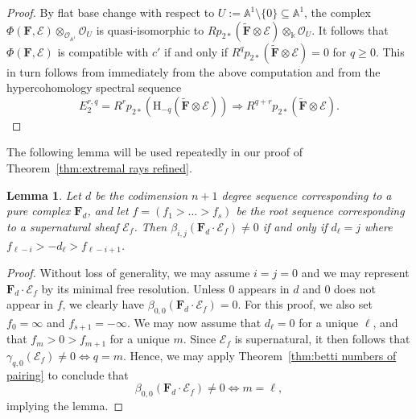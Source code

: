 \documentclass[12pt]{amsart}
\newtheorem{lemma}{Lemma}[section]
\theoremstyle{definition}
\theoremstyle{remark}
\newcommand{\kk}{\Bbbk}
\renewcommand{\AA}{\mathbb{A}}
\newcommand{\HH}{\mathrm{H}}
\newcommand{\bb}{c}
\newcommand{\dd}{d}
\newcommand{\cO}{\mathcal{O}}
\newcommand{\cE}{\mathcal{E}}
\newcommand{\FF}{\mathbf{F}}
\begin{document}
\begin{proof}
By flat base change with respect to $U:=\AA^1\setminus \{0\} \subseteq \AA^1$, the complex $\Phi(\FF,\cE)\otimes_{\cO_{\AA^1}} \cO_{U}$ is quasi-isomorphic to $Rp_{2*}\left(\widetilde{\FF}\otimes \cE\right)\otimes_{\kk} \cO_{U}$.  It follows that $\Phi(\FF,\cE)$ is compatible with $\bb'$ if and only if $R^qp_{2*}\left(\widetilde{\FF}\otimes \cE\right)=0$ for $q\geq 0$.  This in turn follows from immediately from the above computation and from the hypercohomology spectral sequence
\[
E_2^{r,q}=R^{r}p_{2*}(\HH_{-q}(\widetilde{\FF}\otimes \cE))\Rightarrow R^{q+r}p_{2*}(\widetilde{\FF}\otimes \cE).
\]
\end{proof}


The following lemma will be used repeatedly in our proof of Theorem~\ref{thm:extremal rays refined}.
\begin{lemma}\label{lem:pure and supernatural}
Let $\dd$ be the codimension $n+1$ degree sequence corresponding to a pure complex $\FF_d$, and let $f=(f_1>\dots >f_s)$ be the root sequence corresponding to a supernatural sheaf $\cE_f$.  Then
$
\beta_{i,j}(\FF_d\cdot \cE_f)\ne 0
$
if and only if $d_\ell=j$ where $f_{\ell-i}>-d_{\ell}>f_{\ell-i+1}$.\end{lemma}
\begin{proof}
Without loss of generality, we may assume $i=j=0$ and we may represent $\FF_d\cdot \cE_f$ by its minimal free resolution. Unless $0$ appears in $\dd$ and $0$ does not appear in $f$, we clearly have $\beta_{0,0}(\FF_d\cdot \cE_f)=0$.  For this proof, we also set $f_0=\infty$ and $f_{s+1}=-\infty$. We may now assume that $d_{\ell}=0$ for a unique $\ell$, and that $f_m>0>f_{m+1}$ for a unique $m$.
Since $\cE_f$ is supernatural, it then follows that $\gamma_{q,0}(\cE_f)\ne 0 \iff q=m$.  Hence, we may apply Theorem~\ref{thm:betti numbers of pairing} to conclude that
\[
\beta_{0,0}(\FF_d\cdot \cE_f)\ne 0 \iff m=\ell,
\]
implying the lemma.
\end{proof}
\end{document}
